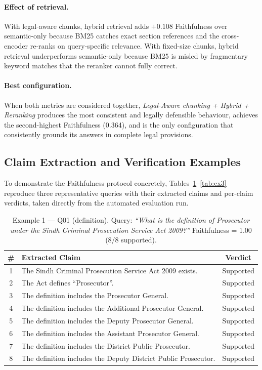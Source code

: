\documentclass[11pt,a4paper]{article}
\begin{document}
\paragraph{Effect of retrieval.} With legal-aware chunks, hybrid retrieval adds $+0.108$ Faithfulness over semantic-only because BM25 catches exact section references and the cross-encoder re-ranks on query-specific relevance. With fixed-size chunks, hybrid retrieval underperforms semantic-only because BM25 is misled by fragmentary keyword matches that the reranker cannot fully correct.

\paragraph{Best configuration.} When both metrics are considered together, \emph{Legal-Aware chunking + Hybrid + Reranking} produces the most consistent and legally defensible behaviour, achieves the second-highest Faithfulness (0.364), and is the only configuration that consistently grounds its answers in complete legal provisions.

\subsection{Claim Extraction and Verification Examples}

To demonstrate the Faithfulness protocol concretely, Tables~\ref{tab:ex1}--\ref{tab:ex3} reproduce three representative queries with their extracted claims and per-claim verdicts, taken directly from the automated evaluation run.

\begin{table}[H]
\centering
\footnotesize
\caption{Example 1 --- Q01 (definition). Query: \emph{``What is the definition of Prosecutor under the Sindh Criminal Prosecution Service Act 2009?''} Faithfulness = 1.00 (8/8 supported).}
\label{tab:ex1}
\renewcommand{\arraystretch}{1.2}
\begin{tabularx}{\textwidth}{@{}c >{\RaggedRight\arraybackslash}X c@{}}
\toprule
\textbf{\#} & \textbf{Extracted Claim} & \textbf{Verdict} \\
\midrule
1 & The Sindh Criminal Prosecution Service Act 2009 exists. & Supported \\
2 & The Act defines ``Prosecutor''. & Supported \\
3 & The definition includes the Prosecutor General. & Supported \\
4 & The definition includes the Additional Prosecutor General. & Supported \\
5 & The definition includes the Deputy Prosecutor General. & Supported \\
6 & The definition includes the Assistant Prosecutor General. & Supported \\
7 & The definition includes the District Public Prosecutor. & Supported \\
8 & The definition includes the Deputy District Public Prosecutor. & Supported \\
\bottomrule
\end{tabularx}
\end{table}
\end{document}
